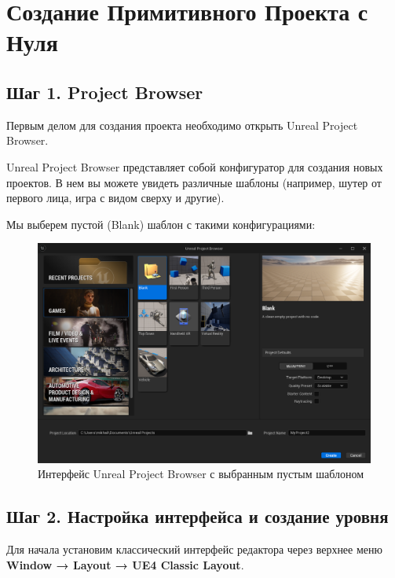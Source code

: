 \newpage
\section{Создание Примитивного Проекта с Нуля}

\subsection{Шаг 1. Project Browser}
Первым делом для создания проекта необходимо открыть Unreal Project Browser.

Unreal Project Browser представляет собой конфигуратор для создания новых проектов. 
В нем вы можете увидеть различные шаблоны (например, шутер от первого лица, игра с видом сверху и другие).

Мы выберем пустой (Blank) шаблон с такими конфигурациями:
\begin{figure}[h]
    \centering
    \includegraphics[width=\textwidth]{Lections/ProjectBrowser.png}
    \caption{Интерфейс Unreal Project Browser с выбранным пустым шаблоном}
\end{figure}

\subsection{Шаг 2. Настройка интерфейса и создание уровня}
Для начала установим классический интерфейс редактора через верхнее меню \textbf{Window → Layout → UE4 Classic Layout}.

